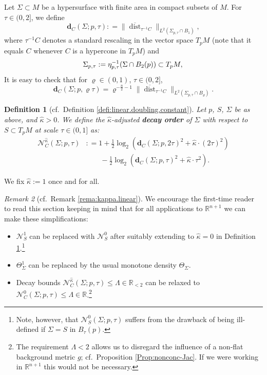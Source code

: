 \documentclass[11pt, letterpaper, reqno]{amsart}
\numberwithin{equation}{section}
\newtheorem{Def}{Definition}[section]
\theoremstyle{remark}
\newtheorem{Rem}[Def]{Remark}
\newcommand{\RR}{\mathbb{R}}
\newcommand{\cN}{\mathcal{N}}
\newcommand{\mbfd}{\mathbf{d}}
\newcommand{\dist}{\operatorname{dist}}
\newcommand{\Sdist}{\overline{\dist}}
\begin{document}
Let $\Sigma \subset M$ be a hypersurface with finite area in compact subsets of $M$. For $\tau \in (0, 2]$, we define
\begin{equation} \label{eq:dist.to.cone}
\mbfd_C(\Sigma; p, \tau) : = \|\Sdist_{\tau^{-1} C}\|_{L^2(\Sigma_{p,\tau}\cap B_1)},
\end{equation}
where $\tau^{-1} C$ denotes a standard rescaling in the vector space $T_p M$ (note that it equals $C$ whenever $C$ is a hypercone in $T_p M$) and 
\[
	\Sigma_{p,\tau} := \eta_{p,\tau}^{-1}(\Sigma \cap B_2(p)) \subset T_p M, \\
\]
It is easy to check that for $\varrho \in (0,1)$, $\tau \in (0, 2]$,
\[
\mbfd_C(\Sigma; p, \varrho\tau) = \varrho^{-\frac n 2- 1}\|\Sdist_{\tau^{-1} C}\|_{L^2(\Sigma_{p,\tau}\cap B_\varrho)}. 
\]

\begin{Def}[cf.\ Definition {\ref{defi:linear.doubling.constant}}]  \label{defi:doubling.constant.nonlinear}
	Let $p$, $S$, $\Sigma$ be as above, and $\hat \kappa > 0$. We define the $\hat \kappa$-adjusted \textbf{decay order} of $\Sigma$ with respect to $S \subset T_p M$ at scale $\tau \in (0, 1]$  as:
\begin{align*}
	\cN^{\hat \kappa}_C(\Sigma; p, \tau) 
    & : = 1 + \frac 12 \log_2(\mbfd_C(\Sigma; p, 2\tau)^2+ \hat \kappa \cdot (2\tau)^2) \\
    & \qquad - \frac 12 \log_2(\mbfd_C(\Sigma; p, \tau)^2 + \hat \kappa \cdot \tau^2).
\end{align*}
\end{Def}

We fix $\hat \kappa := 1$ once and for all. 

\begin{Rem}[cf.\ Remark {\ref{rema:kappa.linear}}] \label{rema:kappa.nonlinear}
	We encourage the first-time reader to read this section keeping in mind that for all applications to $\RR^{n+1}$ we can make these simplifications:
	\begin{itemize}
		\item $\cN^{{1}}_S$ can be replaced with $\cN^0_S$ after suitably extending to $\hat \kappa = 0$ in Definition \ref{defi:doubling.constant.nonlinear}.\footnote{Note, however, that $\cN^0_S(\Sigma; p, \tau)$ suffers from the drawback of being ill-defined if $\Sigma = S$ in $B_\tau(p)$.}
		\item $\Theta^{1}_\Sigma$ can be replaced by the usual monotone density $\Theta_\Sigma$.
		\item Decay bounds $\cN^{\hat \kappa}_C(\Sigma; p, \tau) \leq \Lambda \in \RR_{<2}$ can be relaxed to $\cN^{0}_C(\Sigma; p, \tau) \leq \Lambda \in \RR$.\footnote{The requirement $\Lambda<2$ allows us to disregard the influence of a non-flat background metric $g$; cf.\ Proposition \ref{Prop:nonconc-Jac}. If we were working in $\RR^{n+1}$ this would not be necessary. }
	\end{itemize}
\end{Rem}
\end{document}
